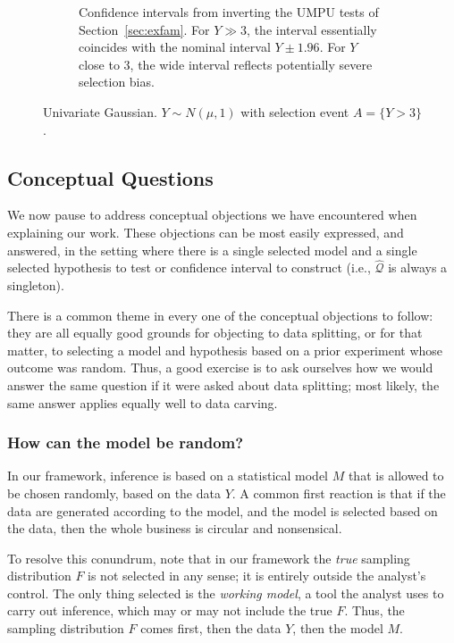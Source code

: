 \documentclass{article}
\theoremstyle{definition}
\newcommand{\hcQ}{\widehat{\mathcal{Q}}}
\begin{document}
\begin{figure}
\begin{subfigure}[t]{0.4\textwidth}
    \caption{Confidence intervals from inverting the UMPU tests of Section~\ref{sec:exfam}. For $Y\gg 3$, the interval essentially coincides with the nominal interval ${Y \pm 1.96}$. For $Y$ close to 3, the wide interval reflects potentially severe selection bias.}
    \label{fig:umpuUnivar}
  \end{subfigure}
  \caption{Univariate Gaussian. $Y\sim N(\mu, 1)$ with selection event $A=\{Y>3\}$.}
\label{fig:univar}
\end{figure}

\subsection{Conceptual Questions}\label{sec:conceptual}

We now pause to address conceptual objections we have encountered when explaining our work. These objections can be most easily expressed, and answered, in the setting where there is a single selected model and a single selected hypothesis to test or confidence interval to construct (i.e., $\hcQ$ is always a singleton).

There is a common theme in every one of the conceptual objections to follow: they are all equally good grounds for objecting to data splitting, or for that matter, to selecting a model and hypothesis based on a prior experiment whose outcome was random. Thus, a good exercise is to ask ourselves how we would answer the same question if it were asked about data splitting; most likely, the same answer applies equally well to data carving.

\subsubsection{How can the model be random?}\label{sec:howRandom}

In our framework, inference is based on a statistical model $M$ that is allowed to be chosen randomly, based on the data $Y$. A common first reaction is that if the data are generated according to the model, and the model is selected based on the data, then the whole business is circular and nonsensical.

To resolve this conundrum, note that in our framework the {\em true} sampling distribution $F$ is not selected in any sense; it is entirely outside the analyst's control. The only thing selected is the {\em working model}, a tool the analyst uses to carry out inference, which may or may not include the true $F$. Thus, the sampling distribution $F$ comes first, then the data $Y$, then the model $M$. 
\end{document}
